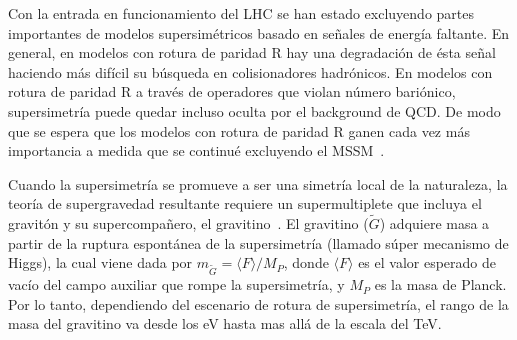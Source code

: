 Con la entrada en funcionamiento del LHC se han estado excluyendo
partes importantes de modelos supersimétricos basado en señales de
energía faltante. En general, en modelos con rotura de paridad R hay
una degradación de ésta señal haciendo más difícil su búsqueda en
colisionadores hadrónicos. En modelos con rotura de paridad R a través
de operadores que violan número bariónico, supersimetría puede quedar
incluso oculta por el background de QCD. De modo que se espera que los
modelos con rotura de paridad R ganen cada vez más importancia a
medida que se continué excluyendo el MSSM~\cite{Bomark:2011fj}.

Cuando la supersimetría se promueve a ser una simetría local de la
naturaleza, la teoría de supergravedad resultante requiere un
supermultiplete que incluya el gravitón y su supercompañero, el
gravitino~\cite{Martin:1997ns,Nilles:1983ge}. El gravitino ($\tilde
G$) adquiere masa a partir de la ruptura espontánea de la
supersimetría (llamado súper mecanismo de Higgs), la cual viene dada
por $m_{\tilde G}=\langle F\rangle/M_P$, donde $\langle F\rangle$ es el valor esperado de vacío
del campo auxiliar que rompe la supersimetría, y $M_P$ es la masa de
Planck. Por lo tanto, dependiendo del escenario de rotura de
supersimetría, el rango de la masa del gravitino va desde los eV hasta
mas allá de la escala del TeV.


